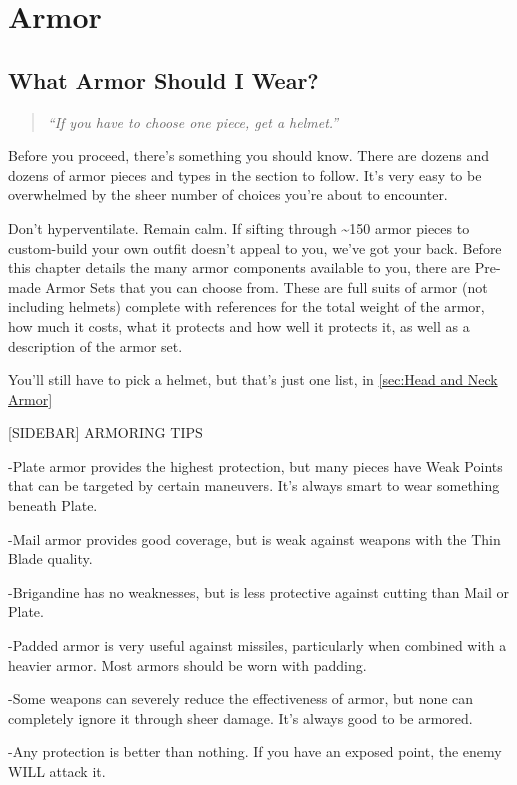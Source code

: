 \documentclass[oneside,11pt,english]{book}
\begin{document}
\chapter{Armor}\label{ch:Armor}
\startcontents[chapters]
\clearpage
\section{What Armor Should I Wear?}
\begin{quote}
  \centering
  \emph{“If you have to choose one piece, get a helmet.”}
\end{quote}
Before you proceed, there’s something you should know. There are dozens and dozens of armor pieces and types in 
the section to follow. It’s very easy to be overwhelmed by the sheer number of choices you’re about to encounter. 

Don’t hyperventilate. Remain calm. If sifting through \textasciitilde150 armor pieces to custom-build your own outfit doesn’t
appeal to you, we’ve got your back. Before this chapter details the many armor components available to you, there are
Pre-made Armor Sets that you can choose from. These are full suits of armor (not including helmets) complete with 
references for the total weight of the armor, how much it costs, what it protects and how well it protects it, as well as a description of the armor set.

You’ll still have to pick a helmet, but that’s just one list, in \autoref{sec:Head and Neck Armor}

[SIDEBAR] ARMORING TIPS %

-Plate armor provides the highest protection, but many pieces have Weak Points that can be targeted by certain 
maneuvers. It’s always smart to wear something beneath Plate.

-Mail armor provides good coverage, but is weak against weapons with the Thin Blade quality.

-Brigandine has no weaknesses, but is less protective against cutting than Mail or Plate.

-Padded armor is very useful against missiles, particularly when combined with a heavier armor. Most armors should be worn with padding.

-Some weapons can severely reduce the effectiveness of armor, but none can completely ignore it through sheer 
damage. It’s always good to be armored.

-Any protection is better than nothing. If you have an exposed point, the enemy WILL attack it. 
\end{document}
